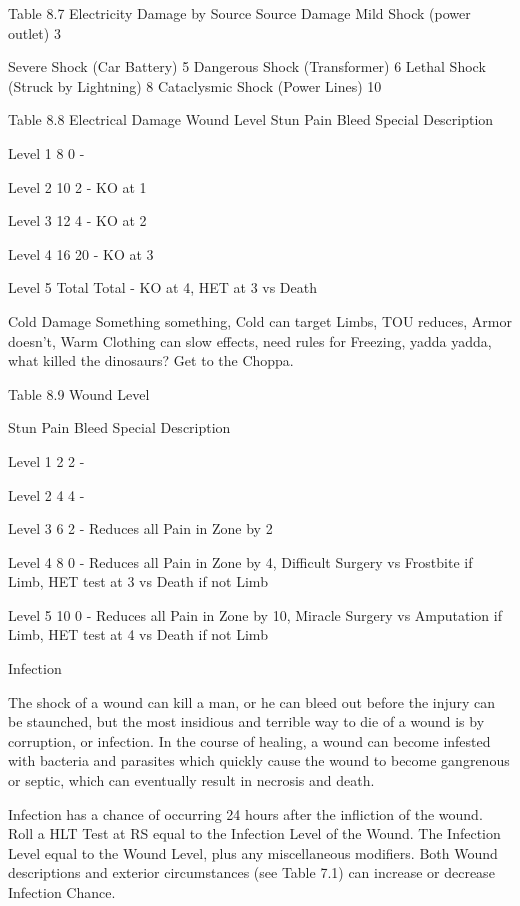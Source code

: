 \documentclass[oneside,11pt,english]{book}
\begin{document}
 

Table 8.7 Electricity Damage by Source 
Source Damage 
Mild Shock (power outlet) 3 


Severe Shock (Car Battery) 5 
Dangerous Shock (Transformer) 6 
Lethal Shock (Struck by Lightning) 8 
Cataclysmic Shock (Power Lines) 10 

 
Table 8.8 Electrical Damage 
Wound Level Stun Pain Bleed Special Description 

Level 1 8 0 - 

Level 2 10 2 - KO at 1 

Level 3 12 4 - KO at 2 

Level 4 16 20 - KO at 3 

Level 5 Total Total - KO at 4, HET at 3 vs Death 

 

 

Cold Damage 
Something something, Cold can target Limbs, TOU reduces, Armor doesn’t, Warm Clothing can slow 
effects, need rules for Freezing, yadda yadda, what killed the dinosaurs? Get to the Choppa. 

 

Table 8.9 
Wound 
Level 

Stun Pain Bleed Special Description 

Level 1 2 2 - 

Level 2 4 4 - 

Level 3 6 2 - Reduces all Pain in Zone by 2 

Level 4 8 0 - Reduces all Pain in Zone by 4, Difficult Surgery vs 
Frostbite if Limb, HET test at 3 vs Death if not Limb 

 

 

Level 5 10 0 - Reduces all Pain in Zone by 10, Miracle Surgery vs 
Amputation if Limb, HET test at 4 vs Death if not Limb 

 

 

 

Infection 


The shock of a wound can kill a man, or he can bleed out before the injury can be staunched, but the most 
insidious and terrible way to die of a wound is by corruption, or infection. In the course of healing, a 
wound can become infested with bacteria and parasites which quickly cause the wound to become 
gangrenous or septic, which can eventually result in necrosis and death. 

 

Infection has a chance of occurring 24 hours after the infliction of the wound. Roll a HLT Test at RS 
equal to the Infection Level of the Wound. The Infection Level equal to the Wound Level, plus any 
miscellaneous modifiers. Both Wound descriptions and exterior circumstances (see Table 7.1) can 
increase or decrease Infection Chance. 
\end{document}
